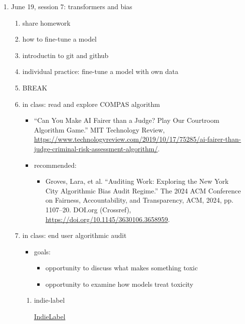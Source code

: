\documentclass[11pt]{article}
\begin{document}
\begin{enumerate}
\item June 19, session 7: transformers and bias
\label{sec:org96ae030}
\begin{enumerate}
\item share homework
\label{sec:org0dd93ec}
\item how to fine-tune a model
\label{sec:org6aeeeec}
\item introductin to git and github
\label{sec:org6530aca}
\item individual practice: fine-tune a model with own data
\label{sec:org09d926d}
\item BREAK
\label{sec:org914ac92}
\item in class: read and explore COMPAS algorithm
\label{sec:org5dd0213}
\begin{itemize}
\item “Can You Make AI Fairer than a Judge? Play Our Courtroom Algorithm
Game.” MIT Technology Review,
\url{https://www.technologyreview.com/2019/10/17/75285/ai-fairer-than-judge-criminal-risk-assessment-algorithm/}.
\item recommended:
\begin{itemize}
\item Groves, Lara, et al. “Auditing Work: Exploring the New York City
Algorithmic Bias Audit Regime.” The 2024 ACM Conference on
Fairness, Accountability, and Transparency, ACM, 2024, pp.
1107–20. DOI.org (Crossref),
\url{https://doi.org/10.1145/3630106.3658959}.
\end{itemize}
\end{itemize}

\item in class: end user algorithmic audit
\label{sec:org2b772eb}
\begin{itemize}
\item goals:
\begin{itemize}
\item opportunity to discuss what makes something toxic
\item opportunity to examine how models treat toxicity
\end{itemize}
\end{itemize}

\begin{enumerate}
\item indie-label
\label{sec:orgf7a720e}

\href{https://github.com/StanfordHCI/indie-label}{IndieLabel}


\end{enumerate}
\end{enumerate}
\end{enumerate}
\end{document}
